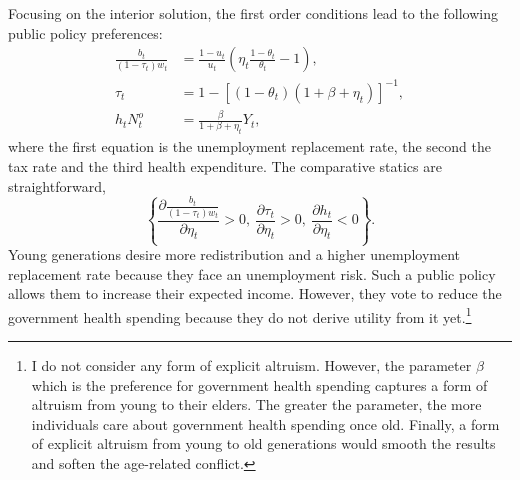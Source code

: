 \documentclass[
]{article}
\begin{document}
Focusing on the interior solution, the first order conditions lead to the following public policy preferences:
\begin{align}
    \frac{b_t}{(1-\tau_t)w_t} &= \frac{1-u_t}{u_t} \left(\eta_t\frac{1-\theta_t}{\theta_t}- 1\right),
    \label{eq:inverse-replacement-rate}\\
    \tau_t &= 1 - \left[\left(1-\theta_t\right)\left(1+\beta+\eta_t\right)\right]^{-1},
    \label{eq:tax-rate} \\
    h_t N^o_t &= \frac{\beta}{1+\beta+\eta_t}Y_t,
    \label{eq:health-expenditure}
    \end{align}
where the first equation is the unemployment replacement rate, the second the tax rate and the third health expenditure. The comparative statics are straightforward,
\begin{equation*}
    \left\lbrace \frac{\partial \frac{b_t}{(1-\tau_t)w_t}}{\partial \eta_t} > 0, ~ \frac{\partial \tau_t}{\partial \eta_t} > 0, ~\frac{\partial h_t}{\partial \eta_t} < 0\right\rbrace.
\end{equation*}
Young generations desire more redistribution and a higher unemployment replacement rate because they face an unemployment risk. Such a public policy allows them to increase their expected income. However, they vote to reduce the government health spending because they do not derive utility from it yet.\footnote{I do not consider any form of explicit altruism. However, the parameter \(\beta\) which is the preference for government health spending captures a form of altruism from young to their elders. The greater the parameter, the more individuals care about government health spending once old. Finally, a form of explicit altruism from young to old generations would smooth the results and soften the age-related conflict.}
\end{document}
